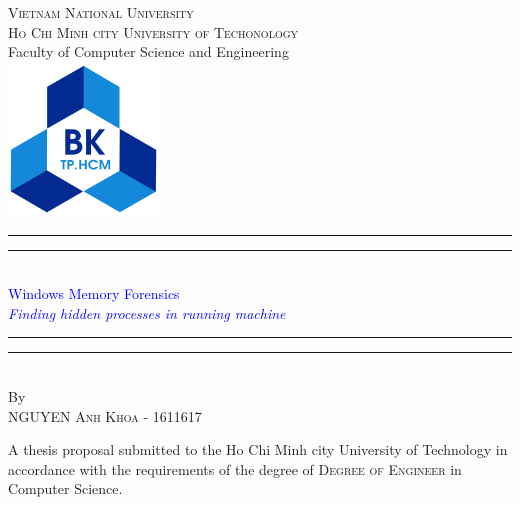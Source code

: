 \begin{titlingpage}
\begin{singlespace}

\begin{center}
{\Large \textsc{Vietnam National University \\Ho Chi Minh city University of Techonology}\\
\vspace{3mm}
Faculty of Computer Science and Engineering
}\\
\vspace{10mm}
\includegraphics[width=0.3\textwidth]{images/logo.png}\\
\vspace{1cm}
\rule[0.5ex]{\linewidth}{2pt}\vspace*{-\baselineskip}\vspace*{3.2pt}
\rule[0.5ex]{\linewidth}{1pt}\\[\baselineskip]
{\huge \textcolor{blue}{Windows Memory Forensics}}\\[4mm]
{\Large \textit{\textcolor{blue}{Finding hidden processes in running machine}}}\\
\rule[0.5ex]{\linewidth}{1pt}\vspace*{-\baselineskip}\vspace{3.2pt}
\rule[0.5ex]{\linewidth}{2pt}\\
\vspace{6.5mm}
{\large By}\\
\vspace{6.5mm}
{\Large\textsc{NGUYEN Anh Khoa - 1611617}}\\
\vspace{15mm}

\begin{minipage}{10cm}
A thesis proposal submitted to the Ho Chi Minh city University of Technology in accordance with the requirements of the degree of \textsc{Degree of Engineer} in Computer Science.
\end{minipage}\\



\end{center}
\end{singlespace}
\end{titlingpage}
